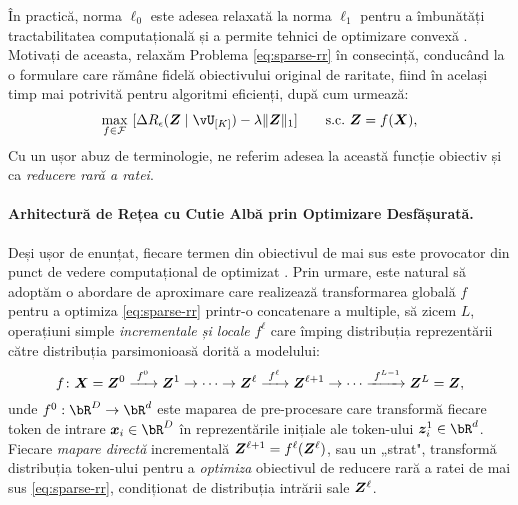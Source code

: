 \documentclass[../../book-main_ro.tex]{subfiles}
\begin{document}
În practică, norma $\ell_0$ este adesea relaxată la norma $\ell_1$ pentru a îmbunătăți tractabilitatea computațională și a permite tehnici de optimizare convexă \cite{Wright-Ma-2022}. Motivați de aceasta, relaxăm Problema \eqref{eq:sparse-rr} în consecință, conducând la o formulare care rămâne fidelă obiectivului original de raritate, fiind în același timp mai potrivită pentru algoritmi eficienți, după cum urmează:
\begin{equation}
\begin{aligned}
   \max_{f \in \mathcal{F}}\ [\Delta R_{\epsilon}(\Z \mid \vU_{[K]}) - \lambda \|\bm{Z}\|_1]  \qquad \text{s.c.}\ \Z = f(\X),
   \label{eq:sparse-rr-1}
\end{aligned}
\end{equation}
Cu un ușor abuz de terminologie, ne referim adesea la această funcție obiectiv și ca \textit{reducere rară a ratei}.

\paragraph{Arhitectură de Rețea cu Cutie Albă prin Optimizare Desfășurată.}


Deși ușor de enunțat, fiecare termen din obiectivul de mai sus este provocator din punct de vedere computațional de optimizat \cite{Wright-Ma-2022}. Prin urmare, este natural să adoptăm o abordare de aproximare care realizează transformarea globală $f$ pentru a optimiza 
\eqref{eq:sparse-rr} printr-o concatenare a multiple, să zicem $L$, operațiuni simple \textit{incrementale și locale} $f^\ell$ care împing distribuția reprezentării către distribuția parsimonioasă dorită a modelului:
\begin{equation}
f\colon \bm{X} = \bm Z^0 \xrightarrow{\hspace{1mm} f^0 \hspace{1mm}} \bm{Z}^1 \rightarrow \cdots \rightarrow \bm{Z}^\ell \xrightarrow{\hspace{1mm} f^{\ell} \hspace{1mm}} \bm{Z}^{\ell+1} \rightarrow  \cdots \xrightarrow{\hspace{1mm} f^{L-1}} \bm{Z}^L = \bm{Z},
\label{eq:incremental}
\end{equation}
unde $f^0: \bR^{D} \rightarrow \bR^{d}$ este maparea de pre-procesare care transformă fiecare token de intrare $\x_{i} \in \bR^{D}$ în reprezentările inițiale ale token-ului $\z_{i}^{1} \in \bR^{d}$.
Fiecare \textit{mapare directă} incrementală $\bm{Z}^{\ell + 1} = f^\ell(\bm{Z}^\ell)$, sau un „strat", transformă distribuția token-ului pentru a \textit{optimiza} obiectivul de reducere rară a ratei de mai sus \eqref{eq:sparse-rr}, condiționat de distribuția intrării sale $\bm{Z}^\ell$.
\end{document}
